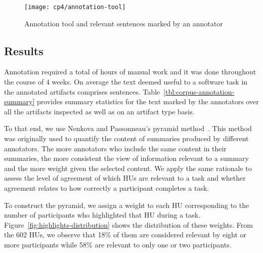 \begin{figure}
    \centering
    \texttt{[image: cp4/annotation-tool]}
    \caption{Annotation tool and relevant sentences marked by an annotator}
    \label{fig:corpus-annotation-tool}
\end{figure}




\subsection{Results}


Annotation required a total of  hours of manual work and it was done throughout the course of 4 weeks.
On average the text deemed useful to a software task in the annotated artifacts comprises 
 sentences. 
Table~\ref{tbl:corpus-annotation-summary} provides summary statistics for the text marked by 
the annotators over all the artifacts inspected as well as on an artifact type basis.






To that end, we use Nenkova and Passonneau's
pyramid method~\cite{Nenkova2004}. This method was originally used
to quantify the content of summaries produced by different annotators.
The more annotators who include the same content in their summaries,
the more consistent the view of information relevant to a summary and
the more weight given the selected content. We apply the same rationale
to assess the level of agreement of which HUs are relevant to a task
and whether agreement relates to how correctly
a participant completes a task.




To construct the pyramid, we assign a weight to each HU
corresponding to the number of participants who highlighted that HU during
a task.
Figure~\ref{fig:highlights-distribution} shows the distribution of these weights.
From the 602 HUs, we observe that 18\% of them are considered relevant by eight or more participants while 58\% are relevant to only one or two participants.






